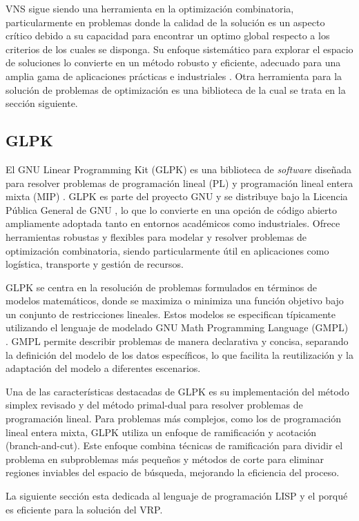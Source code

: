 \documentclass{article}
\begin{document}
VNS sigue siendo una herramienta en la optimización combinatoria, particularmente en problemas donde la calidad de la solución es un aspecto crítico debido a su capacidad para encontrar un optimo global respecto a los criterios de los cuales se disponga. Su enfoque sistemático para explorar el espacio de soluciones lo convierte en un método robusto y eficiente, adecuado para una amplia gama de aplicaciones prácticas e industriales \cite{ref12,ref13,ref14}. Otra herramienta para la solución de problemas de optimización es una  biblioteca de la cual se trata en la sección siguiente.


\subsection{GLPK}
El GNU Linear Programming Kit (GLPK) es una biblioteca de \textit{software} diseñada para resolver problemas de programación lineal (PL) y programación lineal entera mixta (MIP) \cite{ref19}. GLPK es parte del proyecto GNU y se distribuye bajo la Licencia Pública General de GNU \cite{ref21}, lo que lo convierte en una opción de código abierto ampliamente adoptada tanto en entornos académicos como industriales. Ofrece herramientas robustas y flexibles para modelar y resolver problemas de optimización combinatoria, siendo particularmente útil en aplicaciones como logística, transporte y gestión de recursos.

GLPK se centra en la resolución de problemas formulados en términos de modelos matemáticos, donde se maximiza o minimiza una función objetivo bajo un conjunto de restricciones lineales. Estos modelos se especifican típicamente utilizando el lenguaje de modelado GNU Math Programming Language (GMPL) \cite{ref20}. GMPL permite describir problemas de manera declarativa y concisa, separando la definición del modelo de los datos específicos, lo que facilita la reutilización y la adaptación del modelo a diferentes escenarios.

Una de las características destacadas de GLPK es su implementación del método simplex revisado y del método primal-dual para resolver problemas de programación lineal. Para problemas más complejos, como los de programación lineal entera mixta, GLPK utiliza un enfoque de ramificación y acotación (branch-and-cut). Este enfoque combina técnicas de ramificación para dividir el problema en subproblemas más pequeños y métodos de corte para eliminar regiones inviables del espacio de búsqueda, mejorando la eficiencia del proceso.

La siguiente sección esta dedicada al lenguaje de programación LISP y el porqué es eficiente para la solución del VRP.
\end{document}
